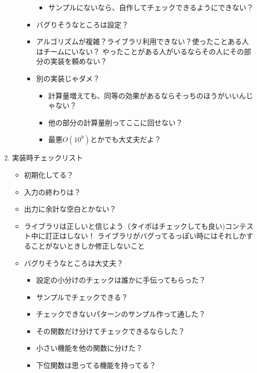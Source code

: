 \documentclass{jsarticle}
\begin{document}
\begin{enumerate}
\begin{itemize}
\begin{itemize}
\begin{itemize}
        \item サンプルにないなら、自作してチェックできるようにできない？
      \end{itemize}
      \item バグりそうなところは設定？
      \item アルゴリズムが複雑？ライブラリ利用できない？使ったことある人はチームにいない？
        \newline やったことがある人がいるならその人にその部分の実装を頼めない？
      \item 別の実装じゃダメ？
      \begin{itemize}
          \item 計算量増えても、同等の効果があるならそっちのほうがいいんじゃない？
          \item 他の部分の計算量削ってここに回せない？
          \item 最悪$O(10^{9})$とかでも大丈夫だよ？
      \end{itemize}
    \end{itemize}
  \end{itemize}
  
  \clearpage
  \item 実装時チェックリスト
  \begin{itemize}
    \item 初期化してる？
    \item 入力の終わりは？
    \item 出力に余計な空白とかない？
    \item ライブラリは正しいと信じよう（タイポはチェックしても良い)コンテスト中に訂正はしない！
      \newline ライブラリがバグってるっぽい時にはそれしかすることがないときしか修正しないこと
    \item バグりそうなところは大丈夫？
    \begin{itemize}
      \item 設定の小分けのチェックは誰かに手伝ってもらった？
      \item サンプルでチェックできる？
      \item チェックできないパターンのサンプル作って通した？
      \item その関数だけ分けてチェックできるならした？
      \item 小さい機能を他の関数に分けた？
      \item 下位関数は思ってる機能を持ってる？
    \end{itemize}
  \end{itemize}
\end{enumerate}
\end{document}
